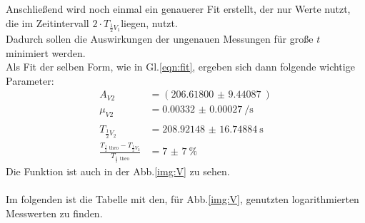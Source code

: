 \newline
\noindent
Anschließend wird noch einmal ein genauerer Fit erstellt, der nur Werte nutzt, die im Zeitintervall $2\cdot T_{\frac{1}{2}V_1}$liegen, nutzt.\\
Dadurch sollen die Auswirkungen der ungenauen Messungen für große $t$ minimiert werden.\\
Als Fit der selben Form, wie in Gl.\ref{eqn:fit}, ergeben sich dann folgende wichtige Parameter:
\begin{align*}
    A_{V2}&=(\SI{206.61800(944087)}{})\\
    \mu_{V2}&=\SI{0.00332(27)}{\per\second}\\\\
    T_{\frac{1}{2}V_2}&= \SI{208.92148(1674884)}{\second}\\
    \frac{T_{\frac{1}{2}\text{ theo}}-T_{\frac{1}{2}V_2}}{T_{\frac{1}{2}\text{ theo}}}&=\SI{7(7)}{\percent}
\end{align*}
Die Funktion ist auch in der Abb.\ref{img:V} zu sehen.\\\\
\noindent
Im folgenden ist die Tabelle mit den, für Abb.\ref{img:V}, genutzten logarithmierten Messwerten zu finden. 
